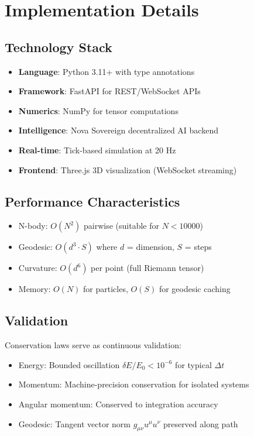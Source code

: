 \documentclass[12pt, a4paper]{article}
\begin{document}
\section{Implementation Details}
\label{sec:implementation}

\subsection{Technology Stack}

\begin{itemize}
    \item \textbf{Language}: Python 3.11+ with type annotations
    \item \textbf{Framework}: FastAPI for REST/WebSocket APIs
    \item \textbf{Numerics}: NumPy for tensor computations
    \item \textbf{Intelligence}: Nova Sovereign decentralized AI backend
    \item \textbf{Real-time}: Tick-based simulation at 20 Hz
    \item \textbf{Frontend}: Three.js 3D visualization (WebSocket streaming)
\end{itemize}

\subsection{Performance Characteristics}

\begin{itemize}
    \item N-body: $O(N^2)$ pairwise (suitable for $N < 10000$)
    \item Geodesic: $O(d^3 \cdot S)$ where $d$ = dimension, $S$ = steps
    \item Curvature: $O(d^6)$ per point (full Riemann tensor)
    \item Memory: $O(N)$ for particles, $O(S)$ for geodesic caching
\end{itemize}

\subsection{Validation}

Conservation laws serve as continuous validation:
\begin{itemize}
    \item Energy: Bounded oscillation $\delta E / E_0 < 10^{-6}$ for typical $\Delta t$
    \item Momentum: Machine-precision conservation for isolated systems
    \item Angular momentum: Conserved to integration accuracy
    \item Geodesic: Tangent vector norm $g_{\mu\nu} u^\mu u^\nu$ preserved along path
\end{itemize}
\end{document}
